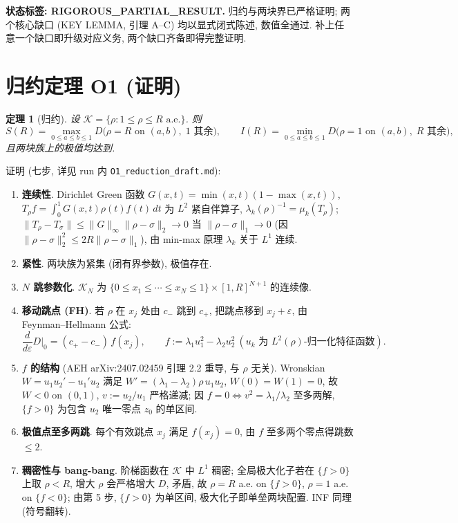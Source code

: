 \documentclass[UTF8]{ctexart}
\newtheorem{theorem}{定理}[section]
\begin{document}
\textbf{状态标签: RIGOROUS\_PARTIAL\_RESULT.} 归约与两块界已严格证明;
两个核心缺口 (KEY LEMMA, 引理 A--C) 均以显式闭式陈述, 数值全通过.
补上任意一个缺口即升级对应义务, 两个缺口齐备即得完整证明.

\section{归约定理 O1 (证明)}

\begin{theorem}[归约]
设 $\mathcal{K} = \{\rho: 1\le\rho\le R \text{ a.e.}\}$. 则
\begin{equation}
	S(R) = \max_{0\le a\le b\le 1} D\bigl(\rho = R \text{ on } (a,b),\; 1 \text{ 其余}\bigr),
	\qquad
	I(R) = \min_{0\le a\le b\le 1} D\bigl(\rho = 1 \text{ on } (a,b),\; R \text{ 其余}\bigr),
\end{equation}
且两块族上的极值均达到.
\end{theorem}

证明 (七步, 详见 run 内 \texttt{O1\_reduction\_draft.md}):
\begin{enumerate}
	\item \textbf{连续性}. Dirichlet Green 函数
		$G(x,t)=\min(x,t)(1-\max(x,t))$, $T_\rho f=\int_0^1 G(x,t)\rho(t)f(t)\,dt$
		为 $L^2$ 紧自伴算子, $\lambda_k(\rho)^{-1} = \mu_k(T_\rho)$;
		$\|T_\rho - T_\sigma\| \le \|G\|_\infty \|\rho-\sigma\|_2 \to 0$ 当
		$\|\rho-\sigma\|_1\to 0$ (因 $\|\rho-\sigma\|_2^2 \le 2R\|\rho-\sigma\|_1$),
		由 min-max 原理 $\lambda_k$ 关于 $L^1$ 连续.
	\item \textbf{紧性}. 两块族为紧集 (闭有界参数), 极值存在.
	\item \textbf{$N$ 跳参数化}. $\mathcal{K}_N$ 为
		$\{0\le x_1\le\cdots\le x_N\le 1\}\times[1,R]^{N+1}$ 的连续像.
	\item \textbf{移动跳点 (FH)}. 若 $\rho$ 在 $x_j$ 处由 $c_-$ 跳到 $c_+$,
		把跳点移到 $x_j+\varepsilon$, 由 Feynman--Hellmann 公式:
		\begin{equation}
			\frac{d}{d\varepsilon}D\big|_0 = (c_+ - c_-)\, f(x_j),
			\qquad f := \lambda_1 u_1^2 - \lambda_2 u_2^2
			\ (u_k \text{ 为 } L^2(\rho)\text{-归一化特征函数}).
		\end{equation}
	\item \textbf{$f$ 的结构} (AEH arXiv:2407.02459 引理 2.2 重导,
		与 $\rho$ 无关). Wronskian
		$W = u_1u_2' - u_1'u_2$ 满足 $W' = (\lambda_1-\lambda_2)\rho\,u_1u_2$,
		$W(0)=W(1)=0$, 故 $W<0$ on $(0,1)$, $v:=u_2/u_1$ 严格递减;
		因 $f=0 \iff v^2 = \lambda_1/\lambda_2$ 至多两解, $\{f>0\}$ 为包含
		$u_2$ 唯一零点 $z_0$ 的单区间.
	\item \textbf{极值点至多两跳}. 每个有效跳点 $x_j$ 满足 $f(x_j)=0$,
		由 $f$ 至多两个零点得跳数 $\le 2$.
	\item \textbf{稠密性与 bang-bang}. 阶梯函数在 $\mathcal{K}$ 中 $L^1$ 稠密;
		全局极大化子若在 $\{f>0\}$ 上取 $\rho<R$, 增大 $\rho$ 会严格增大 $D$,
		矛盾, 故 $\rho = R$ a.e. on $\{f>0\}$, $\rho=1$ a.e. on $\{f<0\}$;
		由第 5 步, $\{f>0\}$ 为单区间, 极大化子即单垒两块配置. INF 同理 (符号翻转).
\end{enumerate}
\end{document}
